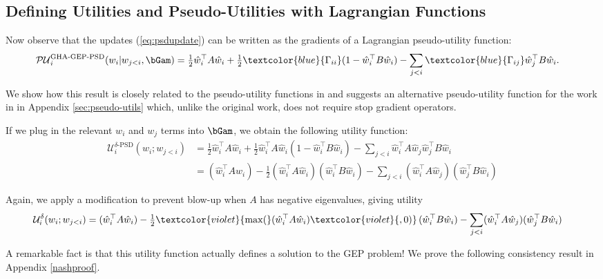\subsection{Defining Utilities and Pseudo-Utilities with Lagrangian Functions}

Now observe that the updates (\ref{eq:psdupdate}) can be written as the gradients of a Lagrangian pseudo-utility function:
\begin{align}
    \label{eq:lagrangeutils}
    \mathcal{PU}_{i}^{\text{GHA-GEP-PSD}}(w_i | w_{j<i}, \bGam )
    &=\tfrac{1}{2} \hat{w}_{i}^{\top}A\hat{w}_{i}
    +\tfrac{1}{2} \textcolor{blue}{\Gamma_{ii}} (1 - \hat{w}_{i}^{\top}B\hat{w}_{i})
    -\sum_{j< i} \textcolor{blue}{\Gamma_{ij}} \hat{w}_{j}^{\top}B\hat{w}_{i}.
\end{align}

We show how this result is closely related to the pseudo-utility functions in \citet{chen2019constrained} and suggests an alternative pseudo-utility function for the work in \citet{gemp2021} in Appendix \ref{sec:pseudo-utils} which, unlike the original work, does not require stop gradient operators.

If we plug in the relevant $w_i$ and $w_j$ terms into $\bGam$, we obtain the following utility function:
\begin{align}
    \label{eq:game-utility-psd}
    \mathcal{U}_{i}^{\delta\text{-PSD}}(w_i ; w_{j<i})
    &=\tfrac{1}{2}\hat{w}_{i}^{\top}A\hat{w}_{i}
    +\tfrac{1}{2}\hat{w}_{i}^{\top}A\hat{w}_{i}\left(1-\hat{w}_{i}^{\top}B\hat{w}_{i}\right)
    -\sum_{j< i} \hat{w}_{i}^{\top}A\hat{w}_{j} \hat{w}_{j}^{\top}B\hat{w}_{i} \nonumber \\
    &= (\hat{w}_{i}^{\top}A\hat{w}_{i})
    - \tfrac{1}{2} (\hat{w}_{i}^{\top}A\hat{w}_{i})(\hat{w}_{i}^{\top}B\hat{w}_{i})
    - \sum_{j< i} (\hat{w}_{i}^{\top}A\hat{w}_{j})( \hat{w}_{j}^{\top}B\hat{w}_{i})
\end{align}

Again, we apply a modification to prevent blow-up when $A$ has negative eigenvalues, giving utility
\begin{align}
    \label{eq:game-utility}
    \mathcal{U}_{i}^{\delta}(w_i ; w_{j<i})
    &= (\hat{w}_{i}^{\top}A\hat{w}_{i})
    - \tfrac{1}{2} \textcolor{violet}{\max(}(\hat{w}_{i}^{\top}A\hat{w}_{i})\textcolor{violet}{,0)}\,(\hat{w}_{i}^{\top}B\hat{w}_{i})
    - \sum_{j< i} (\hat{w}_{i}^{\top}A\hat{w}_{j})( \hat{w}_{j}^{\top}B\hat{w}_{i})
\end{align}

A remarkable fact is that this utility function actually defines a solution to the GEP problem! We prove the following consistency result in Appendix \ref{nashproof}.

